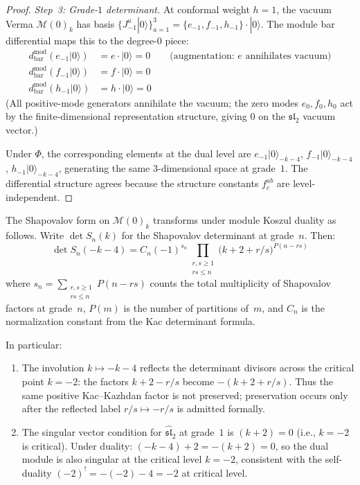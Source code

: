 \begin{proof}
\emph{Step~3: Grade-$1$ determinant.}
At conformal weight $h = 1$, the vacuum Verma
$\mathcal{M}(0)_k$ has basis
$\{J^a_{-1}|0\rangle\}_{a=1}^3 = \{e_{-1}, f_{-1}, h_{-1}\}
\cdot |0\rangle$.
The module bar differential maps this to the degree-$0$ piece:
\begin{align}
d_{\mathrm{bar}}^{\mathrm{mod}}(e_{-1}|0\rangle)
&= e \cdot |0\rangle = 0
\qquad \text{(augmentation: $e$ annihilates vacuum)} \\
d_{\mathrm{bar}}^{\mathrm{mod}}(f_{-1}|0\rangle)
&= f \cdot |0\rangle = 0 \\
d_{\mathrm{bar}}^{\mathrm{mod}}(h_{-1}|0\rangle)
&= h \cdot |0\rangle = 0
\end{align}
(All positive-mode generators annihilate the vacuum; the zero
modes $e_0, f_0, h_0$ act by the finite-dimensional
representation structure, giving $0$ on the $\mathfrak{sl}_2$
vacuum vector.)

Under $\Phi$, the corresponding elements at the dual level
are $e_{-1}|0\rangle_{-k-4}$, $f_{-1}|0\rangle_{-k-4}$,
$h_{-1}|0\rangle_{-k-4}$, generating the same $3$-dimensional
space at grade~$1$. The differential structure agrees because the
structure constants $f^{ab}_c$ are level-independent.
\end{proof}

\begin{proposition}
\label{prop:shapovalov-koszul}
The Shapovalov form on $\mathcal{M}(0)_k$ transforms under
module Koszul duality as follows. Write
$\det S_n(k)$ for the Shapovalov determinant at grade~$n$.
Then:
\begin{equation}\label{eq:shapovalov-transform}
\det S_n(-k-4)
= C_n(-1)^{s_n}
\prod_{\substack{r,s \geq 1 \\ rs \leq n}}
\bigl(k + 2 + r/s\bigr)^{P(n-rs)}
\end{equation}
where $s_n = \sum_{\substack{r,s \geq 1 \\ rs \leq n}} P(n - rs)$
counts the total multiplicity of Shapovalov factors at grade~$n$,
$P(m)$ is the number of partitions of~$m$, and $C_n$ is the
normalization constant from the Kac determinant formula.

In particular:
\begin{enumerate}[label=\textup{(\roman*)}]
\item The involution $k\mapsto -k-4$ reflects the determinant
 divisors across the critical point $k=-2$: the factors
 $k+2-r/s$ become $-(k+2+r/s)$. Thus the same positive
 Kac--Kazhdan factor is not preserved; preservation occurs only
 after the reflected label $r/s\mapsto -r/s$ is admitted formally.
\item The singular vector condition for
 $\widehat{\mathfrak{sl}}_2$ at grade~$1$ is
 $(k+2) = 0$ \textup{(}i.e., $k = -2$ is critical\textup{)}.
 Under duality: $(-k-4) + 2 = -(k+2) = 0$, so the dual module
 is also singular at the critical level $k = -2$, consistent
 with the self-duality $(-2)^! = -(-2)-4 = -2$ at critical
 level.
\end{enumerate}
\end{proposition}

